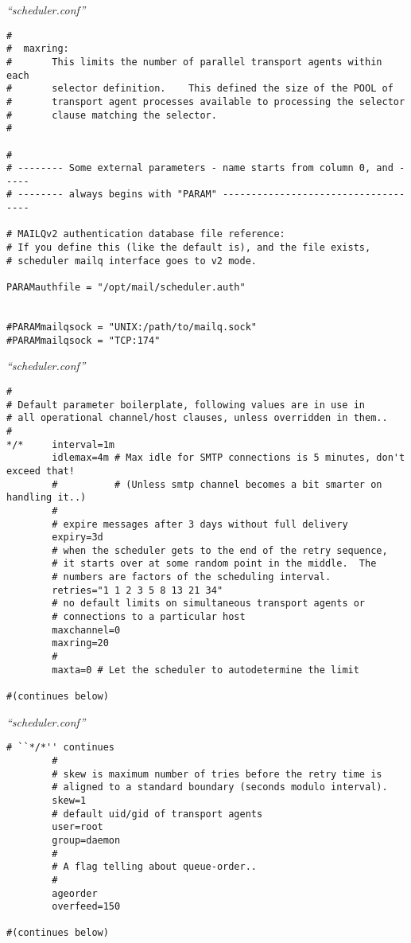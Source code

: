\documentclass[a4paper,landscape]{slides}
\begin{document}
\begin{overlay}
\small
\centerline{{\it ``scheduler.conf''}}
\tiny
\begin{verbatim}
#
#  maxring:
#       This limits the number of parallel transport agents within each
#       selector definition.    This defined the size of the POOL of
#       transport agent processes available to processing the selector
#       clause matching the selector.
#

#
# -------- Some external parameters - name starts from column 0, and -----
# -------- always begins with "PARAM" ------------------------------------

# MAILQv2 authentication database file reference:
# If you define this (like the default is), and the file exists,
# scheduler mailq interface goes to v2 mode.

PARAMauthfile = "/opt/mail/scheduler.auth"


#PARAMmailqsock = "UNIX:/path/to/mailq.sock"
#PARAMmailqsock = "TCP:174"
\end{verbatim}
\vfill
\end{overlay}
\begin{overlay}
\small
\centerline{{\it ``scheduler.conf''}}
\tiny
\begin{verbatim}
#
# Default parameter boilerplate, following values are in use in
# all operational channel/host clauses, unless overridden in them..
#
*/*     interval=1m
        idlemax=4m # Max idle for SMTP connections is 5 minutes, don't exceed that!
        #          # (Unless smtp channel becomes a bit smarter on handling it..)
        #
        # expire messages after 3 days without full delivery
        expiry=3d
        # when the scheduler gets to the end of the retry sequence,
        # it starts over at some random point in the middle.  The
        # numbers are factors of the scheduling interval.
        retries="1 1 2 3 5 8 13 21 34"
        # no default limits on simultaneous transport agents or
        # connections to a particular host
        maxchannel=0
        maxring=20
        #
        maxta=0 # Let the scheduler to autodetermine the limit

#(continues below)
\end{verbatim}
\vfill
\end{overlay}
\begin{overlay}
\small
\centerline{{\it ``scheduler.conf''}}
\tiny
\begin{verbatim}
# ``*/*'' continues
        #
        # skew is maximum number of tries before the retry time is
        # aligned to a standard boundary (seconds modulo interval).
        skew=1
        # default uid/gid of transport agents
        user=root
        group=daemon
        #
        # A flag telling about queue-order..
        #
        ageorder
        overfeed=150

#(continues below)
\end{verbatim}
\vfill
\end{overlay}
\end{document}
